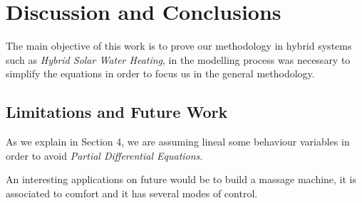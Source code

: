 \chapter{Discussion and Conclusions}
\label{ch:conclusions}
The main objective of this work is to prove our methodology in hybrid systems such as \emph{Hybrid Solar Water Heating}, in the modelling process was necessary to simplify the equations in order to focus us in the general methodology. 

\section{Limitations and Future Work}
\label{sec:limitations}

As we explain in Section 4, we are assuming lineal some behaviour variables in order to avoid \emph{Partial Differential Equations}.

An interesting applications on future would be  to build a massage machine, it is associated to comfort and it has several modes of control.

